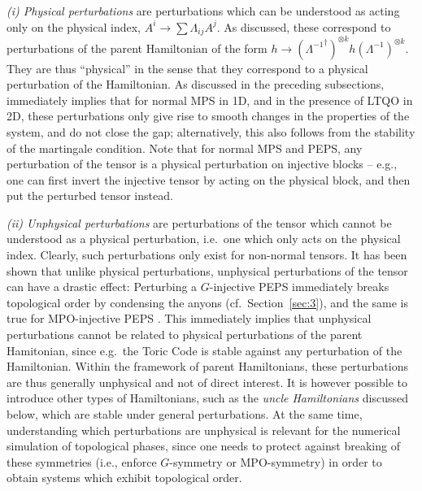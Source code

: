 \documentclass[rmp,aps,reprint,superscriptaddress,nobalancelastpage]{revtex4-1}
\begin{document}
\emph{(i) Physical perturbations} are perturbations which can be understood as acting only on the physical index, $A^i\to \sum\Lambda_{ij} A^j$. As discussed, these correspond to perturbations of the parent Hamiltonian of the form
$h\to({\Lambda^{-1}}^\dagger)^{\otimes k}h(\Lambda^{-1})^{\otimes k}$. They are thus ``physical'' in the sense that they correspond to a physical perturbation of the Hamiltonian. As discussed in the preceding subsections, immediately implies that for normal MPS in 1D, and in the presence of LTQO in 2D, these perturbations only give rise to smooth changes in the properties of the system, and do not close the gap; alternatively, this also follows from the stability of the martingale condition.  Note that for normal MPS and PEPS, any perturbation of the tensor is a physical perturbation on injective blocks -- e.g., one can first invert the injective tensor by acting on the physical block, and then put the perturbed tensor instead.

\emph{(ii) Unphysical perturbations} are perturbations of the tensor which cannot be understood as a physical perturbation, i.e.\ one which only acts on the physical index. Clearly, such perturbations only exist for non-normal tensors. It has been shown that unlike physical perturbations, unphysical perturbations of the tensor can have a drastic effect: Perturbing a $G$-injective PEPS immediately breaks topological order \cite{chen:topo-symmetry-conditions} by condensing the anyons (cf.~Section~\ref{sec:3}), and the same is true for MPO-injective PEPS \cite[][though MPO-injective PEPS are stable against certain unphysical perturbations]{shukla:tns-stringnet-pert-condensation}. This immediately implies that unphysical perturbations cannot be related to physical perturbations of the parent Hamitonian, since e.g.\ the Toric Code is stable against any perturbation of the Hamiltonian.  Within the framework of parent Hamiltonians, these perturbations are thus generally unphysical and not of direct interest.  It is however possible to introduce other types of Hamiltonians, such as the \emph{uncle Hamiltonians} discussed below, which are stable under general perturbations. At the same time, understanding which perturbations are unphysical is relevant for the numerical simulation of topological phases, since one needs to protect against breaking of these symmetries (i.e., enforce $G$-symmetry or MPO-symmetry) in order to obtain systems which exhibit topological order.
\end{document}
